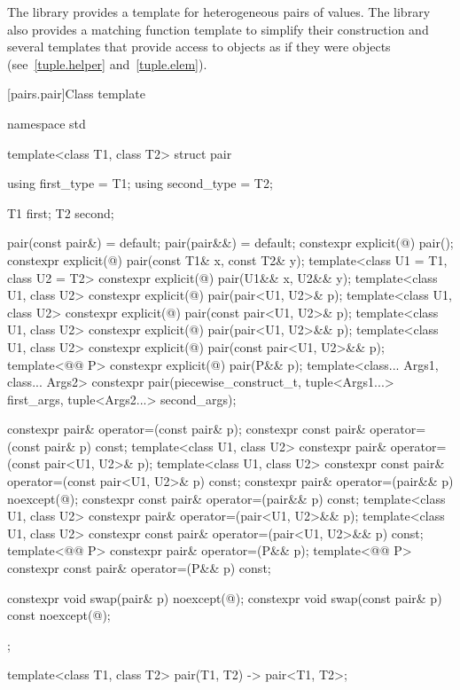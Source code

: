 \pnum
The library provides a template for heterogeneous pairs of values.
The library also provides a matching function template to simplify
their construction and several templates that provide access to 
objects as if they were  objects (see~\ref{tuple.helper}
and~\ref{tuple.elem}).%
%
%
%

[pairs.pair]{Class template }

%
\begin{codeblock}
namespace std {
  template<class T1, class T2>
  struct pair {
    using first_type  = T1;
    using second_type = T2;

    T1 first;
    T2 second;

    pair(const pair&) = default;
    pair(pair&&) = default;
    constexpr explicit(@\seebelow@) pair();
    constexpr explicit(@\seebelow@) pair(const T1& x, const T2& y);
    template<class U1 = T1, class U2 = T2>
      constexpr explicit(@\seebelow@) pair(U1&& x, U2&& y);
    template<class U1, class U2>
      constexpr explicit(@\seebelow@) pair(pair<U1, U2>& p);
    template<class U1, class U2>
      constexpr explicit(@\seebelow@) pair(const pair<U1, U2>& p);
    template<class U1, class U2>
      constexpr explicit(@\seebelow@) pair(pair<U1, U2>&& p);
    template<class U1, class U2>
      constexpr explicit(@\seebelow@) pair(const pair<U1, U2>&& p);
    template<@@ P>
      constexpr explicit(@\seebelow@) pair(P&& p);
    template<class... Args1, class... Args2>
      constexpr pair(piecewise_construct_t,
                     tuple<Args1...> first_args, tuple<Args2...> second_args);

    constexpr pair& operator=(const pair& p);
    constexpr const pair& operator=(const pair& p) const;
    template<class U1, class U2>
      constexpr pair& operator=(const pair<U1, U2>& p);
    template<class U1, class U2>
      constexpr const pair& operator=(const pair<U1, U2>& p) const;
    constexpr pair& operator=(pair&& p) noexcept(@\seebelow@);
    constexpr const pair& operator=(pair&& p) const;
    template<class U1, class U2>
      constexpr pair& operator=(pair<U1, U2>&& p);
    template<class U1, class U2>
      constexpr const pair& operator=(pair<U1, U2>&& p) const;
    template<@@ P>
      constexpr pair& operator=(P&& p);
    template<@@ P>
      constexpr const pair& operator=(P&& p) const;

    constexpr void swap(pair& p) noexcept(@\seebelow@);
    constexpr void swap(const pair& p) const noexcept(@\seebelow@);
  };

  template<class T1, class T2>
    pair(T1, T2) -> pair<T1, T2>;
}
\end{codeblock}

